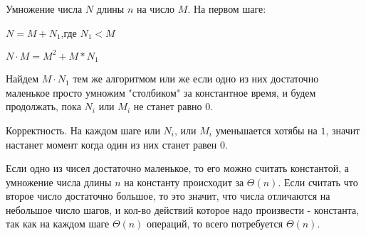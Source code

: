 \documentclass[a4paper,12pt]{article}
\begin{document}
Умножение числа $N$ длины $n$ на число $M$. На первом шаге:

$N=M+N_{1}$,где $N_{1}<M$

$N\cdot M=M^2+M*N_{1}$

Найдем $M\cdot N_{1}$ тем же алгоритмом или же если одно из них достаточно маленькое просто умножим "столбиком" за константное время, и будем продолжать, пока $N_{i}$ или $M_{i}$ не станет равно $0$.

Корректность. На каждом шаге или $N_{i}$, или $M_{i}$ уменьшается хотябы на $1$, значит настанет момент когда один из них станет равен $0$.

Если одно из чисел достаточно маленькое, то его можно считать константой, а умножение числа длины $n$ на константу происходит за $\Theta(n)$. Если считать что второе число достаточно большое, то это значит, что числа отличаются на небольшое число шагов, и кол-во действий которое надо произвести - константа, так как на каждом шаге $\Theta(n)$ операций, то всего потребуется $\Theta(n)$.
\end{document}

